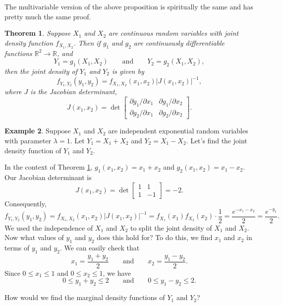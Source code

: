\documentclass[12pt]{article}
\theoremstyle{plain}
\newtheorem{theorem}{Theorem}[section]
\theoremstyle{definition}
\newtheorem{example}[theorem]{Example}
\theoremstyle{remark}
\newcommand{\R}{\mathbb{R}}
\begin{document}
The multivariable version of the above proposition is spiritually the same and has pretty much the same proof.
\begin{theorem}\label{change of variables}
    Suppose $X_1$ and $X_2$ are continuous random variables with joint density function $f_{X_1, X_2}$.
    Then if $g_1$ and $g_2$ are continuously differentiable functions $\R^2\to \R$, and
    \[
        Y_1 = g_1(X_1, X_2)\qquad\text{and}\qquad Y_2 = g_2(X_1, X_2),
    \]
    then the joint density of $Y_1$ and $Y_2$ is given by
    \[
        f_{Y_1, Y_2}(y_1, y_2) = f_{X_1, X_2}(x_1, x_2)|J(x_1, x_2)|^{-1},
    \]
    where $J$ is the Jacobian determinant,
    \[
        J(x_1, x_2) = \det \begin{bmatrix}
            \partial g_1/\partial x_1 & \partial g_1/\partial x_2\\
            \partial g_2/\partial x_1 & \partial g_2/\partial x_2
        \end{bmatrix}.
    \]
\end{theorem}

\begin{example}
    Suppose $X_1$ and $X_2$ are independent exponential random variables with parameter $\lambda = 1$.
    Let $Y_1 = X_1 + X_2$ and $Y_2 = X_1 - X_2$.
    Let's find the joint density function of $Y_1$ and $Y_2$.

    In the context of Theorem \ref{change of variables}, $g_1(x_1, x_2) = x_1+x_2$ and $g_2(x_1, x_2) = x_1 - x_2$.
    Our Jacobian determinant is
    \[
        J(x_1, x_2) = \det \begin{bmatrix}
            1 & 1\\
            1 & -1
        \end{bmatrix} = -2.
    \]
    Consequently,
    \[
        f_{Y_1, Y_2}(y_1, y_2) = f_{X_1, X_2}(x_1, x_2)|J(x_1, x_2)|^{-1} = f_{X_1}(x_1)f_{X_2}(x_2)\cdot \frac{1}{2} = \frac{e^{-x_1-x_2}}{2} = \frac{e^{-y_1}}{2}.
    \]
    We used the independence of $X_1$ and $X_2$ to split the joint density of $X_1$ and $X_2$.
    Now what values of $y_1$ and $y_2$ does this hold for?
    To do this, we find $x_1$ and $x_2$ in terms of $y_1$ and $y_2$.
    We can easily check that
    \[
        x_1 = \frac{y_1+y_2}{2}\qquad\text{and}\qquad x_2 = \frac{y_1-y_2}{2}.
    \]
    Since $0\leq x_1\leq 1$ and $0\leq x_2\leq 1$, we have
    \[
        0 \leq y_1+y_2 \leq 2\qquad\text{and}\qquad 0\leq y_1-y_2\leq 2.
    \]

    How would we find the marginal density functions of $Y_1$ and $Y_2$?
\end{example}
\end{document}
